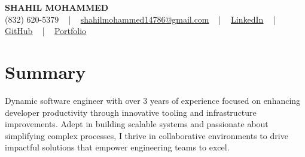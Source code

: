 \documentclass[letterpaper,10pt]{article}
\begin{document}
\begin{center}
    {\fontsize{14pt}{12pt}\selectfont \textbf{\MakeUppercase{Shahil Mohammed}}}\\ \vspace{2pt}
    \fontsize{10pt}{12pt}\selectfont (832) 620-5379 ~ | ~ \href{mailto:shahilmohammed14786@gmail.com}{shahilmohammed14786@gmail.com} ~ | ~  
    \href{https://www.linkedin.com/in/shahil-mohammed-9652931a1/}{\color{blue}\underline{LinkedIn}}  ~ | ~ 
    \href{https://github.com/freakbeast14}{\color{blue}\underline{GitHub}} ~ | ~ 
    \href{https://shahil-mohammed.netlify.app/}{\color{blue}\underline{Portfolio}}
    \vspace{-8pt}
\end{center}

\section{Summary}
\vspace{-2pt}\fontsize{8pt}{9pt}\selectfont
Dynamic software engineer with over 3 years of experience focused on enhancing developer productivity through innovative tooling and infrastructure improvements. Adept in building scalable systems and passionate about simplifying complex processes, I thrive in collaborative environments to drive impactful solutions that empower engineering teams to excel.
 \vspace{-5pt}
 
\vspace{-2pt}
\end{document}

